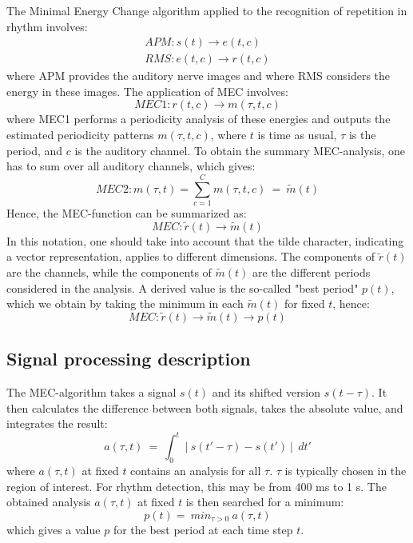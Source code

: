 The Minimal Energy Change algorithm applied to the recognition of
repetition in rhythm involves:
\begin{eqnarray}
    APM: s(t) \rightarrow e(t,c)\\
    RMS: e(t,c) \rightarrow r(t,c)
\end{eqnarray}
where APM provides the auditory nerve images and where RMS
considers the energy in these images. The application of MEC
involves:
\begin{equation}
    MEC1:  r(t,c) \rightarrow m(\tau,t,c)
\end{equation}
where MEC1 performs a periodicity analysis of these energies and
outputs the estimated periodicity patterns $m(\tau,t,c)$, where
$t$ is time as usual, $\tau$ is the period, and $c$ is the
auditory channel. To obtain the summary MEC-analysis, one has to
sum over all auditory channels, which gives:
\begin{equation}
    MEC2: m(\tau,t) = \sum_{c=1}^{C} m(\tau,t,c)~=~\tilde{m}(t)
\end{equation}
Hence, the MEC-function can be summarized as:
\begin{equation}
    MEC:  \tilde{r}(t) \rightarrow \tilde{m}(t)
\end{equation}
In this notation, one should take into account that the tilde
character, indicating a vector representation, applies to
different dimensions. The components of $\tilde{r}(t)$ are the
channels, while the components of $\tilde{m}(t)$ are the different
periods considered in the analysis. A derived value is the
so-called "best period" $p(t)$, which we obtain by taking the
minimum in each $\tilde{m}(t)$ for fixed $t$, hence:
\begin{equation}
    MEC:  \tilde{r}(t) \rightarrow \tilde{m}(t) \rightarrow p(t)
\end{equation}


\subsection{Signal processing description}

The MEC-algorithm takes a signal $s(t)$ and its shifted version
$s(t-\tau)$. It then calculates the difference between both
signals, takes the absolute value, and integrates the result:
\begin{equation}\label{MECM1}
    a(\tau,t)~=~
    \int_{0}^{t}~\left|~
    s(t'-\tau)-s(t') ~\right|~
    ~dt'
\end{equation}
where $a(\tau,t)$ at fixed $t$ contains an analysis for all
$\tau$. $\tau$ is typically chosen in the region of interest. For
rhythm detection, this may be from 400 ms to 1 s. The obtained
analysis $a(\tau,t)$ at fixed $t$ is then searched for a minimum:
\begin{equation}\label{MECM2}
    p(t) = ~min_{\tau>0}~a(\tau,t)
\end{equation}
which gives a value $p$ for the best period at each time step $t$.

